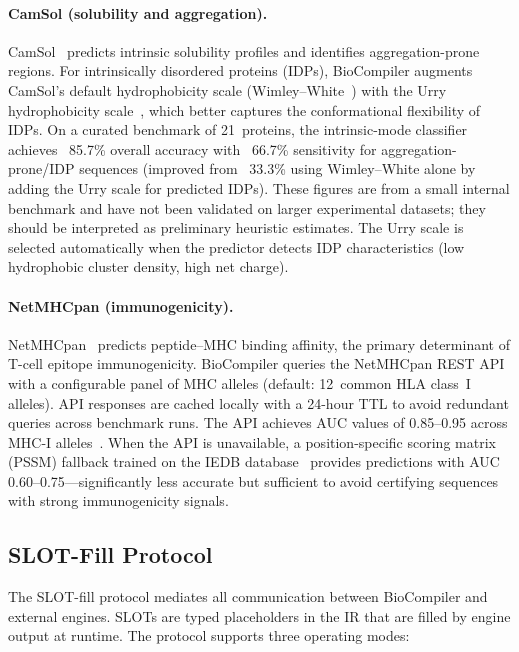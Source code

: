 \paragraph{CamSol (solubility and aggregation).}
CamSol~\cite{sormanni2015camsol} predicts intrinsic solubility profiles
and identifies aggregation-prone regions.  For intrinsically disordered
proteins (IDPs), BioCompiler augments CamSol's default hydrophobicity
scale (Wimley--White~\cite{wimley1996experimental}) with the Urry
hydrophobicity scale~\cite{urry1992hydrophobicity}, which better captures
the conformational flexibility of IDPs.
On a curated benchmark of 21~proteins, the intrinsic-mode classifier
achieves ~85.7\% overall accuracy with ~66.7\% sensitivity for
aggregation-prone/IDP sequences (improved from ~33.3\% using
Wimley--White alone by adding the Urry scale for predicted IDPs).
These figures are from a small internal benchmark and have not been
validated on larger experimental datasets; they should be interpreted
as preliminary heuristic estimates.  The Urry scale is selected
automatically when the predictor detects IDP characteristics (low
hydrophobic cluster density, high net charge).

\paragraph{NetMHCpan (immunogenicity).}
NetMHCpan~\cite{reynisson2020netmhcpan} predicts peptide--MHC binding
affinity, the primary determinant of T-cell epitope immunogenicity.
BioCompiler queries the NetMHCpan REST API with a configurable panel of
MHC alleles (default: 12~common HLA class~I alleles).  API responses are
cached locally with a 24-hour TTL to avoid redundant queries across
benchmark runs.  The API achieves AUC values of 0.85--0.95 across MHC-I
alleles~\cite{reynisson2020netmhcpan}.  When the API is unavailable, a
position-specific scoring matrix (PSSM) fallback trained on the IEDB
database~\cite{vita2019iedb} provides predictions with AUC
0.60--0.75---significantly less accurate but sufficient to avoid
certifying sequences with strong immunogenicity signals.

\subsection{SLOT-Fill Protocol}\label{sec:slot}

The SLOT-fill protocol mediates all communication between BioCompiler and
external engines.  SLOTs are typed placeholders in the IR that are filled
by engine output at runtime.  The protocol supports three operating
modes:

